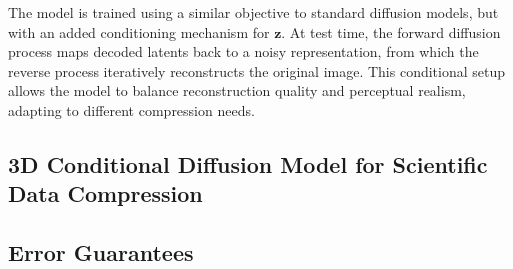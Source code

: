The model is trained using a similar objective to standard diffusion models, but with an added conditioning mechanism for $\boldsymbol{z}$. At test time, the forward diffusion process maps decoded latents back to a noisy representation, from which the reverse process iteratively reconstructs the original image. This conditional setup allows the model to balance reconstruction quality and perceptual realism, adapting to different compression needs.


\subsection{3D Conditional Diffusion Model for Scientific Data Compression}

\subsection{Error Guarantees}